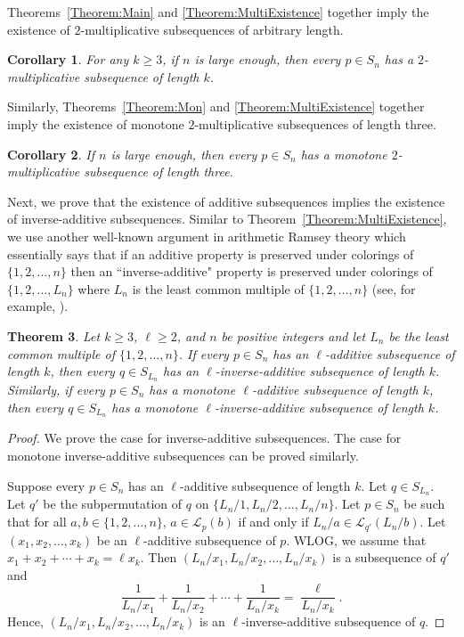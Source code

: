 \documentclass[11pt]{article}
\newtheorem{theorem}{Theorem}[section]
\newtheorem{corollary}[theorem]{Corollary}
\theoremstyle{definition}
\begin{document}
Theorems~\ref{Theorem:Main} and \ref{Theorem:MultiExistence} together imply the existence of $2$-multiplicative subsequences of arbitrary length.

\begin{corollary}
    For any $k\geq3$, if $n$ is large enough, then every $p\in S_n$ has a $2$-multiplicative subsequence of length $k$.
\end{corollary}

Similarly, Theorems~\ref{Theorem:Mon} and \ref{Theorem:MultiExistence} together imply the existence of monotone $2$-multiplicative subsequences of length three.

\begin{corollary}
    If $n$ is large enough, then every $p\in S_n$ has a monotone $2$-multiplicative subsequence of length three.
\end{corollary}

Next, we prove that the existence of additive subsequences implies the existence of inverse-additive subsequences. Similar to Theorem~\ref{Theorem:MultiExistence}, we use another well-known argument in arithmetic Ramsey theory which essentially says that if an additive property is preserved under colorings of $\{1,2,\ldots,n\}$ then an ``inverse-additive" property is preserved under colorings of $\{1,2,\ldots,L_n\}$ where $L_n$ is the least common multiple of $\{1,2,\ldots,n\}$ (see, for example, \cite{BrownRodl1991,Gaiser2024,Lefmann1991}).
\begin{theorem}\label{Theorem:InverseExistence}
Let $k\geq3$, $\ell\geq2$, and $n$ be positive integers and let $L_n$ be the least common multiple of $\{1,2,\ldots,n\}$. If every $p\in S_n$ has an $\ell$-additive subsequence of length $k$, then every $q\in S_{L_n}$ has an $\ell$-inverse-additive subsequence of length $k$. Similarly, if every $p\in S_n$ has a monotone $\ell$-additive subsequence of length $k$, then every $q\in S_{L_n}$ has a monotone $\ell$-inverse-additive subsequence of length $k$.
\end{theorem}
\begin{proof}
We prove the case for inverse-additive subsequences. The case for monotone inverse-additive subsequences can be proved similarly.

Suppose every $p\in S_n$ has an $\ell$-additive subsequence of length $k$. Let $q\in S_{L_n}$. Let $q'$ be the subpermutation of $q$ on $\{L_n/1,L_n/2,\ldots,L_n/n\}$. Let $p\in S_n$ be such that for all $a,b\in\{1,2,\ldots,n\}$, $a\in\mathcal{L}_{p}(b)$ if and only if $L_n/a\in\mathcal{L}_{q'}(L_n/b)$. Let $(x_1,x_2,\ldots,x_k)$ be an $\ell$-additive subsequence of $p$. WLOG, we assume that $x_1+x_2+\cdots+x_k=\ell x_k$. Then $(L_n/x_1,L_n/x_2,\ldots,L_n/x_k)$ is a subsequence of $q'$ and
\[
\frac{1}{L_n/x_1}+\frac{1}{L_n/x_2}+\cdots+\frac{1}{L_n/x_k}=\frac{\ell}{L_n/x_k}.
\]
Hence, $(L_n/x_1,L_n/x_2,\ldots,L_n/x_k)$ is an $\ell$-inverse-additive subsequence of $q$.
\end{proof}
\end{document}
